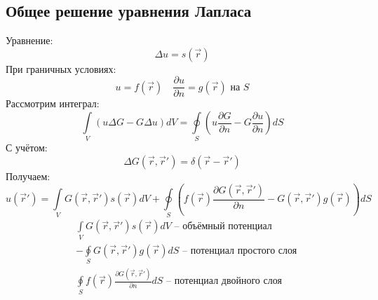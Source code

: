 \subsection{Общее решение уравнения Лапласа}

Уравнение:
\[
	\Delta u = s(\vec{r})
\]
При граничных условиях:
\[
	u = f(\vec{r}) \quad \frac{\partial u}{\partial n} = g(\vec{r}) \text{ на } S
\]
Рассмотрим интеграл:
\[
	\int\limits_V (u \Delta G - G \Delta u) dV = 
	\oint\limits_S \left(u \frac{\partial G}{\partial n} - G \frac{\partial u}{\partial n}\right) dS
\]
С учётом:
\[
	\Delta G(\vec{r}, \vec{r}') = \delta (\vec{r} - \vec{r}')
\]
Получаем:
\[
	u(\vec{r}') = \int\limits_V G(\vec{r}, \vec{r}') s(\vec{r}) dV + \oint\limits_S \left(f(\vec{r}) \frac{\partial G(\vec{r}, \vec{r}')}{\partial n} - G(\vec{r}, \vec{r}') g(\vec{r}) \right) dS
\]
\[
	\begin{aligned}
	&
	\int\limits_V G(\vec{r}, \vec{r}') s(\vec{r}) dV
	\text{ -- объёмный потенциал}
	\\
	& - \oint\limits_S G(\vec{r}, \vec{r}') g(\vec{r}) dS 
	\text{ -- потенциал простого слоя}
	\\
	& \oint\limits_S f(\vec{r}) \frac{\partial G(\vec{r}, \vec{r}')}{\partial n} dS
	\text{ -- потенциал двойного слоя}
	\end{aligned}
\]

